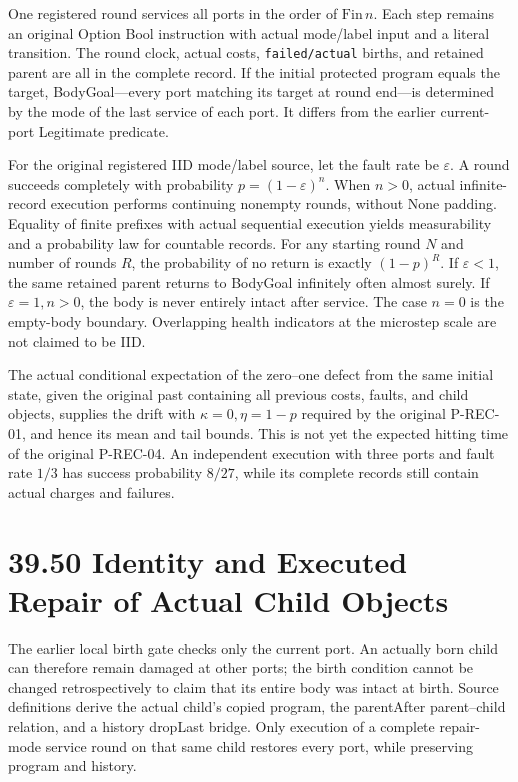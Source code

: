 \documentclass[
  english,
  11pt,
  oneside]{book}
\newcounter{none} %
\begin{document}
One registered round services all ports in the order of \(\mathrm{Fin}\,n\). Each step remains an original Option Bool instruction with actual mode/label input and a literal transition. The round clock, actual costs, \nolinkurl{failed/actual} births, and retained parent are all in the complete record. If the initial protected program equals the target, BodyGoal---every port matching its target at round end---is determined by the mode of the last service of each port. It differs from the earlier current-port Legitimate predicate.

For the original registered IID mode/label source, let the fault rate be \(\varepsilon\). A round succeeds completely with probability \(p=(1-\varepsilon)^n\). When \(n>0\), actual infinite-record execution performs continuing nonempty rounds, without None padding. Equality of finite prefixes with actual sequential execution yields measurability and a probability law for countable records. For any starting round \(N\) and number of rounds \(R\), the probability of no return is exactly \((1-p)^R\). If \(\varepsilon<1\), the same retained parent returns to BodyGoal infinitely often almost surely. If \(\varepsilon=1,n>0\), the body is never entirely intact after service. The case \(n=0\) is the empty-body boundary. Overlapping health indicators at the microstep scale are not claimed to be IID.

The actual conditional expectation of the zero--one defect from the same initial state, given the original past containing all previous costs, faults, and child objects, supplies the drift with \(\kappa=0,\eta=1-p\) required by the original P-REC-01, and hence its mean and tail bounds. This is not yet the expected hitting time of the original P-REC-04. An independent execution with three ports and fault rate \(1/3\) has success probability \(8/27\), while its complete records still contain actual charges and failures.

\section{39.50 Identity and Executed Repair of Actual Child Objects}\label{identity-and-executed-repair-of-actual-child-objects}

The earlier local birth gate checks only the current port. An actually born child can therefore remain damaged at other ports; the birth condition cannot be changed retrospectively to claim that its entire body was intact at birth. Source definitions derive the actual child's copied program, the parentAfter parent--child relation, and a history dropLast bridge. Only execution of a complete repair-mode service round on that same child restores every port, while preserving program and history.
\end{document}
